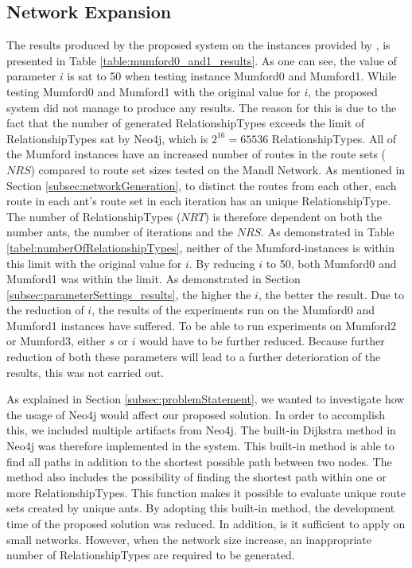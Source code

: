 \subsection{Network Expansion}
\label{subsec:networkExpansion}

The results produced by the proposed system on the instances provided by \citet{mumford13}, is presented in  Table \vref{table:mumford0_and1_results}. As one can see, the value of parameter $i$ is sat to 50 when testing instance Mumford0 and Mumford1. While testing Mumford0 and Mumford1 with the original value for $i$, the proposed system did not manage to produce any results. The reason for this is due to the fact that the number of generated RelationshipTypes exceeds the limit of RelationshipTypes sat by Neo4j, which is $2^{16} = 65 536$ RelationshipTypes. All of the Mumford instances have an increased number of routes in the route sets ($NRS$) compared to route set sizes tested on the Mandl Network. As mentioned in Section \vref{subsec:networkGeneration}, to distinct the routes from each other, each route in each ant's route set in each iteration has an unique RelationshipType. The number of RelationshipTypes ($NRT$) is therefore dependent on both the number ants, the number of iterations and the $NRS$. As demonstrated in Table \vref{tabel:numberOfRelationshipTypes}, neither of the Mumford-instances is within this limit with the original value for $i$. By reducing $i$ to 50, both Mumford0 and Mumford1 was within the limit. As demonstrated in Section \vref{subsec:parameterSettings_results}, the higher the $i$, the better the result. Due to the reduction of $i$, the results of the experiments run on the Mumford0 and Mumford1 instances have suffered. To be able to run experiments on Mumford2 or Mumford3, either $s$ or $i$ would have to be further reduced. Because further reduction of both these parameters will lead to a further deterioration of the results, this was not carried out.

As explained in Section \vref{subsec:problemStatement}, we wanted to investigate how the usage of Neo4j would affect our proposed solution. In order to accomplish this, we included multiple artifacts from Neo4j.  The built-in Dijkstra method in Neo4j was therefore implemented in the system. This built-in method is able to find all paths in addition to the shortest possible path between two nodes. The method also includes the possibility of finding the shortest path within one or more RelationshipTypes. This function makes it possible to evaluate unique route sets created by unique ants. By adopting this built-in method, the development time of the proposed solution was reduced. In addition, is it sufficient to apply on small networks. However, when the network size increase, an inappropriate number of RelationshipTypes are required to be generated.

